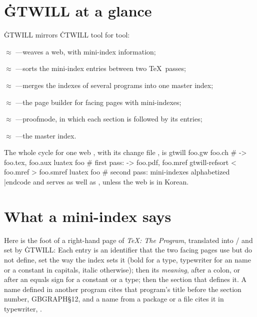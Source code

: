 \chapter{\.{GTWILL} at a glance}
\noindent\.{GTWILL} mirrors \.{CTWILL} tool for tool:

\bull {} $\approx$ ---weaves a web, with mini-index
information;

\bull {} $\approx$ ---sorts the mini-index entries
between two \TeX\ passes;

\bull {} $\approx$ ---merges the indexes of several
programs into one master index;

\bull {} $\approx$ ---the page builder for facing
pages with mini-indexes;

\bull {} $\approx$ ---proofmode, in which each
section is followed by its entries;

\bull {} $\approx$ ---the master index.

\noindent The whole cycle for one web , with its change file
, is
\begincode
gtwill foo.gw foo.ch                  # -> foo.tex, foo.aux
luatex foo                            # first pass: -> foo.pdf, foo.mref
gtwill-refsort < foo.mref > foo.smref
luatex foo                            # second pass: mini-indexes alphabetized
|endcode
and  serves as well as , unless the web is in Korean.

\chapter{What a mini-index says}
\noindent Here is the foot of a right-hand page of {\sl \TeX: The Program},
translated into \GO/ and set by \.{GTWILL}:
\samplemini
 {
  }
 {
  }
 {
  }%
Each entry is an identifier that the two facing pages use but do not define,
set the way the index sets it (bold for a type, typewriter for an  name
or a constant in capitals, italic otherwise); then its {\it meaning}, after a
colon, or after an equals sign for a constant or a type; then the section that
defines it. A name defined in another program cites that program's title before
the section number, {\sc GBGRAPH}\thinspace\S12, and a name from a package or a
file cites it in typewriter, .

